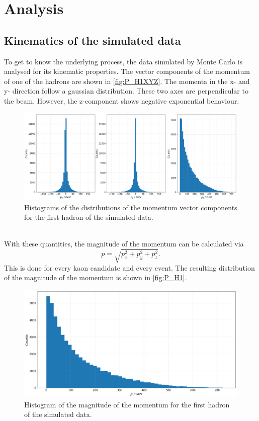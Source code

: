 \section{Analysis}
\label{sec:Analysis}

\subsection{Kinematics of the simulated data}
\label{sec:simdata}
To get to know the underlying process, the data simulated by Monte Carlo is analysed for its kinematic properties. The vector components of the momentum
of one of the hadrons are shown in \autoref{fig:P_H1XYZ}. The momenta in the x- and y- direction follow a gaussian distribution. These two axes are perpendicular
to the beam. However, the z-component shows negative exponential behaviour.
\begin{figure}
  \centering
  \includegraphics[width = .95\textwidth]{"content/pics/P_H1XYZ.png"}

  \caption{Histograms of the distributions of the momentum vector components for the first hadron of the simulated data.}
  \label{fig:P_H1XYZ}
\end{figure}
\\ With these quantities, the magnitude of the momentum can be calculated via 
\begin{equation}
  \label{eq:magn_p}
    p = \sqrt{p_x^2 + p_y^2 + p_z^2}.
\end{equation}
This is done for every kaon candidate and every event.
The resulting distribution of the magnitude of the momentum is shown in \autoref{fig:P_H1}.
\begin{figure}
  \centering
  \includegraphics[width = .7\textwidth]{"content/pics/P_H1.png"}
  \caption{Histogram of the magnitude of the momentum for the first hadron of the simulated data.}
  \label{fig:P_H1}
\end{figure}
